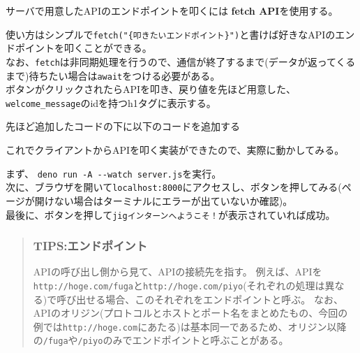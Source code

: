 サーバで用意したAPIのエンドポイントを叩くには \textbf{fetch
API}を使用する。

使い方はシンプルで\texttt{fetch("\{叩きたいエンドポイント\}")}と書けば好きなAPIのエンドポイントを叩くことができる。\\
なお、\texttt{fetch}は非同期処理を行うので、通信が終了するまで(データが返ってくるまで)待ちたい場合は\texttt{await}をつける必要がある。\\
ボタンがクリックされたらAPIを叩き、戻り値を先ほど用意した、\texttt{welcome\_message}のidを持つh1タグに表示する。

先ほど追加したコードの下に以下のコードを追加する

\begin{Shaded}
\begin{Highlighting}[]
  \DataTypeTok{\textless{}}\DataTypeTok{\textgreater{}}
    \NormalTok{(}\NormalTok{)} \OperatorTok{=} \NormalTok{ () }\KeywordTok{=\textgreater{}}\NormalTok{ \{}
      \OperatorTok{=}  \NormalTok{(}\NormalTok{)}\OperatorTok{;}
      \NormalTok{(}\NormalTok{)} \OperatorTok{=} \NormalTok{()}\OperatorTok{;}
\NormalTok{    \}}\OperatorTok{;}
  \DataTypeTok{\textless{}/}\DataTypeTok{\textgreater{}}
\end{Highlighting}
\end{Shaded}

これでクライアントからAPIを叩く実装ができたので、実際に動かしてみる。

まず、 \texttt{deno\ run\ -A\ -\/-watch\ server.js}を実行。\\
次に、ブラウザを開いて\texttt{localhost:8000}にアクセスし、ボタンを押してみる(ページが開けない場合はターミナルにエラーが出ていないか確認)。\\
最後に、ボタンを押して\texttt{jigインターンへようこそ！}が表示されていれば成功。

\begin{quote}
\subsubsection{TIPS:エンドポイント}\label{tipsux30a8ux30f3ux30c9ux30ddux30a4ux30f3ux30c8}

APIの呼び出し側から見て、APIの接続先を指す。
例えば、APIを\texttt{http://hoge.com/fuga}と\texttt{http://hoge.com/piyo}(それぞれの処理は異なる)で呼び出せる場合、このそれぞれをエンドポイントと呼ぶ。
なお、APIのオリジン(プロトコルとホストとポート名をまとめたもの、今回の例では\texttt{http://hoge.com}にあたる)は基本同一であるため、オリジン以降の\texttt{/fuga}や\texttt{/piyo}のみでエンドポイントと呼ぶことがある。
\end{quote}

